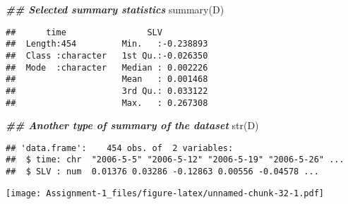 \documentclass[
]{article}
\newenvironment{Shaded}{\begin{snugshade}}{\end{snugshade}}
\newcommand{\AttributeTok}[1]{\textcolor[rgb]{0.77,0.63,0.00}{#1}}
\newcommand{\DocumentationTok}[1]{\textcolor[rgb]{0.56,0.35,0.01}{\textbf{\textit{#1}}}}
\newcommand{\FunctionTok}[1]{\textcolor[rgb]{0.00,0.00,0.00}{#1}}
\newcommand{\NormalTok}[1]{#1}
\newcommand{\OtherTok}[1]{\textcolor[rgb]{0.56,0.35,0.01}{#1}}
\newcommand{\SpecialCharTok}[1]{\textcolor[rgb]{0.00,0.00,0.00}{#1}}
\begin{document}
\begin{Shaded}
\begin{Highlighting}[]
\DocumentationTok{\#\# Selected summary statistics}
\FunctionTok{summary}\NormalTok{(D)}
\end{Highlighting}
\end{Shaded}

\begin{verbatim}
##      time                SLV           
##  Length:454         Min.   :-0.238893  
##  Class :character   1st Qu.:-0.026350  
##  Mode  :character   Median : 0.002226  
##                     Mean   : 0.001468  
##                     3rd Qu.: 0.033122  
##                     Max.   : 0.267308
\end{verbatim}

\begin{Shaded}
\begin{Highlighting}[]
\DocumentationTok{\#\# Another type of summary of the dataset}
\FunctionTok{str}\NormalTok{(D)}
\end{Highlighting}
\end{Shaded}

\begin{verbatim}
## 'data.frame':    454 obs. of  2 variables:
##  $ time: chr  "2006-5-5" "2006-5-12" "2006-5-19" "2006-5-26" ...
##  $ SLV : num  0.01376 0.03286 -0.12863 0.00556 -0.04578 ...
\end{verbatim}

\begin{Shaded}
\end{Shaded}

\texttt{[image: Assignment-1\_files/figure-latex/unnamed-chunk-32-1.pdf]}
\end{document}
